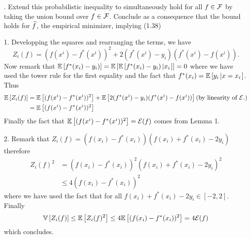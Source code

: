 . Extend this probabilistic inequality to simultaneously hold for all $f \in \mathcal{F}$ by taking the 
union bound over $f \in \mathcal{F}$. Conclude as a consequence that the bound holds for $\widehat f$, the empirical minimizer, implying (1.38)
\begin{solution}[]
1. Developping the squares and rearranging the terms, we have
   \[Z_i(f) = (f(x^i)-f^*(x^i))^2 +2(f^*(x^i)-y_i)(f^*(x^i)-f(x^i)).\] 
 Now remark that $\mathbb{E}\left[f^*(x_i)-y_i)\right]= \mathbb{E}\left[\mathbb{E}\left[f^*(x_i)-y_i)\left|x_i\right.\right]\right] = 0$ 
 where we have used the tower rule for the first equality and the fact that $f^*(x_i)=\mathbb{E}\left[y_i\left|x=x_i\right.\right]$.
Thus
\begin{align*}
    \mathbb{E}\left[Z_i(f)\right] &= \mathbb{E}\left[(f(x^i)-f^*(x^i))^2\right] + \mathbb{E}\left[2(f^*(x^i)-y_i)(f^*(x^i)-f(x^i))\right] \text{(by linearity of $\mathcal{E}{.}$)} \\
                &= \mathbb{E}\left[(f(x^i)-f^*(x^i))^2\right]
\end{align*}
Finally the fact that $\mathbb{E}\left[(f(x^i)-f^*(x^i))^2\right]= \mathcal{E}(f)$ comes from Lemma 1.

2. Remark that $Z_i(f) = (f(x_i)-f^*(x_i))(f(x_i)+f^*(x_i)-2y_i)$ therefore
\begin{align*}
    Z_i(f)^2 &=  (f(x_i)-f^*(x_i))^2(f(x_i)+f^*(x_i)-2y_i)^2\\
    &\leq 4(f(x_i)-f^*(x_i))^2
\end{align*}
where we have used the fact that for all $f(x_i)+f^*(x_i)-2y_i \in [-2,2].$
Finally
\[ \mathbb{V}\left[Z_i(f)\right] \leq \mathbb{E}\left[Z_i(f)^2\right] \leq 4 \mathbb{E}\left[(f(x_i)-f^*(x_i))^2\right] = 4\mathcal{E}(f)\]
which concludes.


\end{solution}
